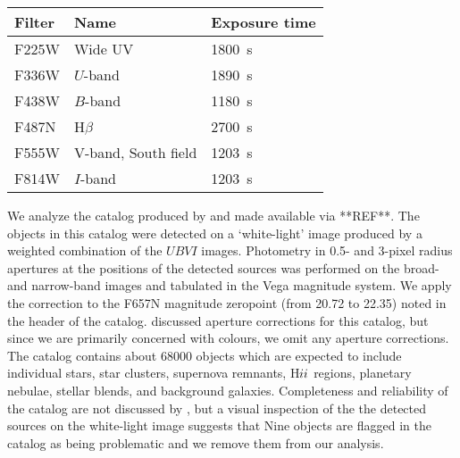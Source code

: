 \begin{table}
\centering
\caption{
\label{tab:filters}}
\begin{tabular}{lll}
\hline\hline
Filter & Name & Exposure time\\
\hline
F225W &  Wide UV & 1800~s\\
F336W &  $U$-band & 1890~s\\ 
F438W &  $B$-band & 1180~s\\
F487N &  H$\beta$ & 2700~s\\
F555W &  V-band, South field & 1203~s\\
F814W &  $I$-band & 1203~s\\
\hline
\end{tabular}
\end{table}

We analyze the catalog produced by \citet{chandar10} and made available via **REF**.
The objects in this catalog were detected on a `white-light' image produced by a weighted combination of the $UBVI$ images.
Photometry in 0.5- and 3-pixel radius apertures at the positions of the detected sources was performed on the broad- and narrow-band images and tabulated in the Vega magnitude system. %
We apply the correction to the F657N magnitude zeropoint (from 20.72 to 22.35) noted in the header of the catalog.
\citet{chandar10} discussed aperture corrections for this catalog, but since we are primarily concerned with colours,
we omit any aperture corrections. %
The catalog contains about 68000 objects which are expected to include individual stars, star clusters,
supernova remnants, H${\sc ii}$ regions, planetary nebulae, %
stellar blends, and background galaxies. %
Completeness and reliability of the catalog are not discussed by \citet{chandar10},
but a visual inspection of the the detected sources on the white-light image suggests that %
Nine objects are flagged in the catalog as being problematic %
and we remove them from our analysis.

